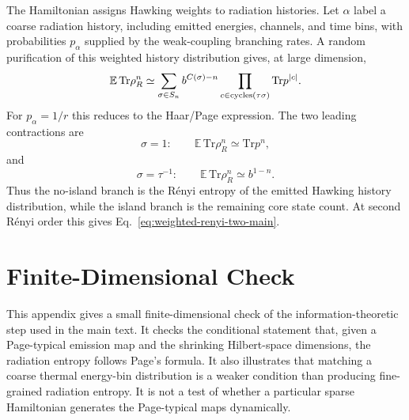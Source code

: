 \documentclass[12pt]{article}
\newcommand{\Tr}{\mathrm{Tr}}
\newcommand{\E}{\mathbb E}
\begin{document}
The Hamiltonian assigns Hawking weights to radiation histories.  Let
$\alpha$ label a coarse radiation history, including emitted energies,
channels, and time bins, with probabilities $p_\alpha$ supplied by the
weak-coupling branching rates.  A random purification of this weighted
history distribution gives, at large dimension,
\begin{equation}
    \E\,\Tr\rho_R^n
    \simeq
    \sum_{\sigma\in S_n}
    b^{C(\sigma)-n}
    \prod_{c\in{\rm cycles}(\tau\sigma)}
    \Tr p^{|c|}.
\end{equation}
For $p_\alpha=1/r$ this reduces to the Haar/Page expression.  The two leading
contractions are
\begin{equation}
    \sigma=1:
    \qquad
    \E\,\Tr\rho_R^n\simeq \Tr p^n,
\end{equation}
and
\begin{equation}
    \sigma=\tau^{-1}:
    \qquad
    \E\,\Tr\rho_R^n\simeq b^{1-n}.
\end{equation}
Thus the no-island branch is the R\'enyi entropy of the emitted Hawking
history distribution, while the island branch is the remaining core state
count.  At second R\'enyi order this gives
Eq.~\eqref{eq:weighted-renyi-two-main}.

\section{Finite-Dimensional Check}
\label{app:finite-check}

This appendix gives a small finite-dimensional check of the
information-theoretic step used in the main text.  It checks the conditional
statement that, given a Page-typical emission map and the shrinking
Hilbert-space dimensions, the radiation entropy follows Page's formula.  It
also illustrates that matching a coarse thermal energy-bin distribution is a
weaker condition than producing fine-grained radiation entropy.  It is not a
test of whether a particular sparse Hamiltonian generates the Page-typical
maps dynamically.
\end{document}
